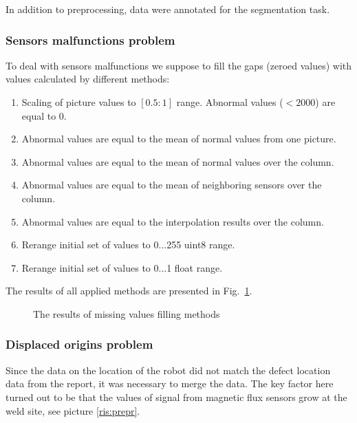 In addition to preprocessing, data were annotated for the segmentation task.

\subsubsection{Sensors malfunctions problem}
To deal with sensors malfunctions we suppose to fill the gaps (zeroed values) with values calculated by different methods:
\begin{enumerate}
	\item Scaling of picture values to $[0.5:1]$ range. Abnormal values ($<2000$) are equal to 0.
	\item Abnormal values are equal to the mean of normal values from one picture.
	\item Abnormal values are equal to the mean of normal values over the column.
	\item Abnormal values are equal to the mean of neighboring sensors over the column.
	\item Abnormal values are equal to the interpolation results over the column.
	\item Rerange initial set of values to 0...255 uint8 range.
	\item Rerange initial set of values to 0...1 float range.
	
	
\end{enumerate}
The results of all applied methods are presented in Fig.~\ref{ris:filling_example}.
\begin{figure}[ht]
	\caption{The results of missing values filling methods}
	\label{ris:filling_example}
\end{figure}

\subsubsection{Displaced origins problem}

Since the data on the location of the robot did not match the defect location data from the report, it was necessary to merge the data. The key factor here turned out to be that the values of signal from magnetic flux sensors grow at the weld site, see picture \ref{ris:prepr}. 

